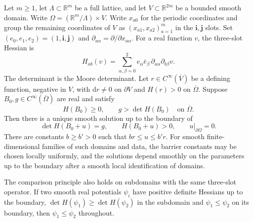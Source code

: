 Let $m\ge1$, let $\Lambda\subset\mathbb R^m$ be a full lattice, and let $V\subset\mathbb R^{2m}$ be a bounded smooth domain. Write $\Omega=(\mathbb R^m/\Lambda)\times V$. Write $x_{a0}$ for the periodic coordinates and group the remaining coordinates of $V$ as $(x_{a1},x_{a2})_{a=1}^m$ in the $\mathbf i,\mathbf j$ slots. Set $(e_0,e_1,e_2)=(1,\mathbf i,\mathbf j)$ and $\partial_{a\alpha}=\partial/\partial x_{a\alpha}$. For a real function $v$, the three-slot Hessian is
\[
H_{ab}(v)=\sum_{\alpha,\beta=0}^2e_\alpha\bar e_\beta\,\partial_{a\alpha}\partial_{b\beta}v .
\]
The determinant is the Moore determinant. Let $r\in C^\infty(\overline V)$ be a defining function, negative in $V$, with $\mathrm dr\ne0$ on $\partial V$ and $H(r)>0$ on $\overline\Omega$. Suppose $B_0,g\in C^\infty(\overline\Omega)$ are real and satisfy
\[
 H(B_0)\ge0,\qquad g>\det H(B_0)\quad\text{on }\overline\Omega .
\]
Then there is a unique smooth solution up to the boundary of
\[
 \det H(B_0+u)=g,\qquad H(B_0+u)>0,\qquad u|_{\partial\Omega}=0.
\]
There are constants $b\ge b'>0$ such that $br\le u\le b'r$. For smooth finite-dimensional families of such domains and data, the barrier constants may be chosen locally uniformly, and the solutions depend smoothly on the parameters up to the boundary after a smooth local identification of domains.

The comparison principle also holds on subdomains with the same three-slot operator. If two smooth real potentials $\psi_i$ have positive definite Hessians up to the boundary, $\det H(\psi_1)\ge\det H(\psi_2)$ in the subdomain and $\psi_1\le\psi_2$ on its boundary, then $\psi_1\le\psi_2$ throughout.

